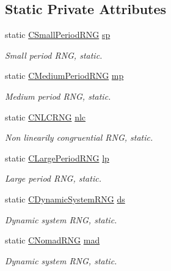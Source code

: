 \subsection*{Static Private Attributes}
\begin{DoxyCompactItemize}
\item 
static \hyperlink{class_c_small_period_r_n_g}{C\-Small\-Period\-R\-N\-G} \hyperlink{class_c_random_generator_a08f99df22f49da96daeed3e60a5b58cb}{sp}
\begin{DoxyCompactList}\small\item\em Small period R\-N\-G, static. \end{DoxyCompactList}\item 
static \hyperlink{class_c_medium_period_r_n_g}{C\-Medium\-Period\-R\-N\-G} \hyperlink{class_c_random_generator_ae0779df3b629839d39406cc6c3d0c2d5}{mp}
\begin{DoxyCompactList}\small\item\em Medium period R\-N\-G, static. \end{DoxyCompactList}\item 
static \hyperlink{class_c_n_l_c_r_n_g}{C\-N\-L\-C\-R\-N\-G} \hyperlink{class_c_random_generator_a255d48443dca5243eb76fef450dc6dc8}{nlc}
\begin{DoxyCompactList}\small\item\em Non linearily congruential R\-N\-G, static. \end{DoxyCompactList}\item 
static \hyperlink{class_c_large_period_r_n_g}{C\-Large\-Period\-R\-N\-G} \hyperlink{class_c_random_generator_a14bf74008fa6ce87d3eb5ddc7a6f853b}{lp}
\begin{DoxyCompactList}\small\item\em Large period R\-N\-G, static. \end{DoxyCompactList}\item 
static \hyperlink{class_c_dynamic_system_r_n_g}{C\-Dynamic\-System\-R\-N\-G} \hyperlink{class_c_random_generator_aaf505f11f33ef8a796792f159ff1000d}{ds}
\begin{DoxyCompactList}\small\item\em Dynamic system R\-N\-G, static. \end{DoxyCompactList}\item 
static \hyperlink{class_c_nomad_r_n_g}{C\-Nomad\-R\-N\-G} \hyperlink{class_c_random_generator_a96e0db20cc6cb16ffe41f5b77480ae39}{mad}
\begin{DoxyCompactList}\small\item\em Dynamic system R\-N\-G, static. \end{DoxyCompactList}\item 

\end{DoxyCompactItemize}
